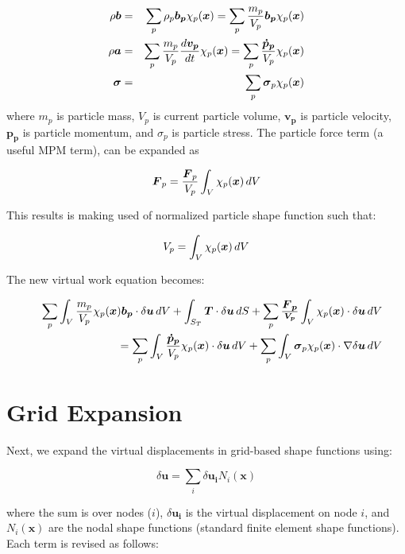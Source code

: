 \documentclass[11pt]{article}
\renewcommand{\vec}[1]{\boldsymbol{#1}}
\newcommand{\tens}[1]{\boldsymbol{\mathsf{#1}}}
\begin{document}
\begin{eqnarray}
    \rho\vec b & = & \sum_p \rho_p \vec{b_p} \chi_p(\vec x) = \sum_p {m_p\over V_p} \vec{b_p}\chi_p(\vec x) \\
    \rho\vec a & = & \sum_p {m_p\over V_p} {d\vec{v_p}\over dt} \chi_p(\vec x) = \sum_p {\vec{\dot p_p}\over V_p} \chi_p(\vec x) \\
    \tens\sigma & = & \sum_p\tens\sigma_p \chi_p(\vec x)
\end{eqnarray}
where $m_p$ is particle mass, $V_p$ is current particle volume, $\vec{v_p}$ is particle velocity, $\vec{p_p}$ is particle momentum, and $\tens\sigma_p$ is particle stress. The particle force term (a useful MPM term), can be expanded as

\begin{equation}
    \vec F_p = {\vec F_p\over V_p} \int_V \chi_p(\vec x)\thinspace dV
\end{equation}

\noindent This results is making used of normalized particle shape function such that:

\begin{equation}
   V_p =  \int_V \chi_p(\vec x)\thinspace dV
\end{equation}

The new virtual work equation becomes:

\begin{eqnarray}
&&\sum_p \int_V {m_p\over V_p} \chi_p(\vec x)\vec{b_p}\cdot \delta\vec u\thinspace dV + \int_{S_T}\vec T \cdot \delta\vec u \thinspace dS + \sum_p \vec {\vec F_p\over V_p} \int_V \chi_p(\vec x) \cdot \delta\vec u\thinspace dV \\
    &&\qquad\qquad
    = \sum_p\int_V {\vec{\dot p_p}\over V_p} \chi_p(\vec x)\cdot \delta\vec u\thinspace dV +  \sum_p\int_V \tens\sigma_p \chi_p(\vec x) \cdot \nabla \delta\vec u\thinspace dV
\end{eqnarray}

\section{Grid Expansion\label{gridexpand}}

Next, we expand the virtual displacements in grid-based shape functions using:

\begin{equation}
     \delta\vec u = \sum_i \delta\vec{u_i} N_i(\vec x)
\end{equation}

\noindent where the sum is over nodes ($i$), $\delta\vec{u_i}$ is the virtual displacement on node $i$, and $N_i(\vec x)$ are the nodal shape functions (standard finite element shape functions). Each term is revised as follows:
\end{document}
